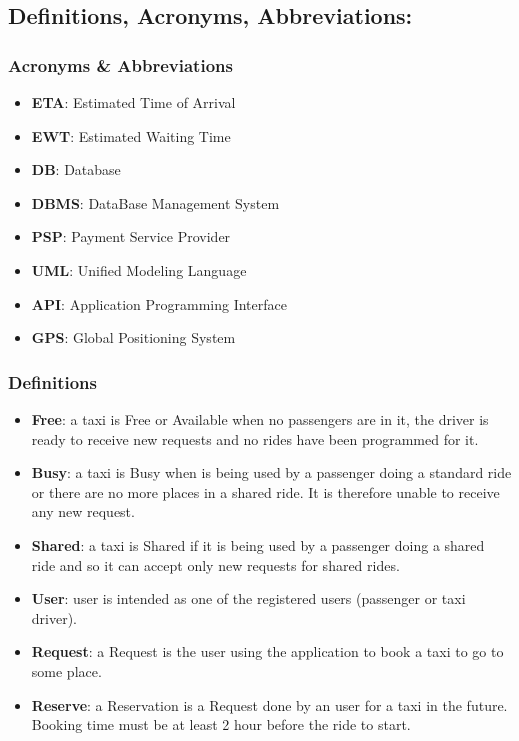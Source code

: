 \documentclass{article}
\begin{document}
\subsection{Definitions, Acronyms, Abbreviations: }

\subsubsection{Acronyms \& Abbreviations}
\begin{itemize}
\item \textbf{ETA}: Estimated Time of Arrival
\item \textbf{EWT}: Estimated Waiting Time
\item \textbf{DB}: Database
\item \textbf{DBMS}: DataBase Management System
\item \textbf{PSP}: Payment Service Provider
\item \textbf{UML}: Unified Modeling Language
\item \textbf{API}: Application Programming Interface
\item \textbf{GPS}: Global Positioning System
\end{itemize}

\subsubsection{Definitions}
\begin{itemize}
\item \textbf{Free}: a taxi is Free or Available when no passengers are in it, the driver is ready to receive new requests and no rides have been programmed for it.
\item \textbf{Busy}: a taxi is Busy when is being used by a passenger doing a standard ride or there are no more places in a shared ride. It is therefore unable to receive any new request.
\item \textbf{Shared}: a taxi is Shared if it is being used by a passenger doing a shared ride and so it can accept only new requests for shared rides.
\item \textbf{User}: user is intended as one of the registered users (passenger or taxi driver).
\item \textbf{Request}: a Request is the user using the application to book a taxi to go to some place.
\item \textbf{Reserve}: a Reservation is a Request done by an user for a taxi in the future. Booking time must be at least 2 hour before the ride to start.
\end{itemize}
\end{document}
